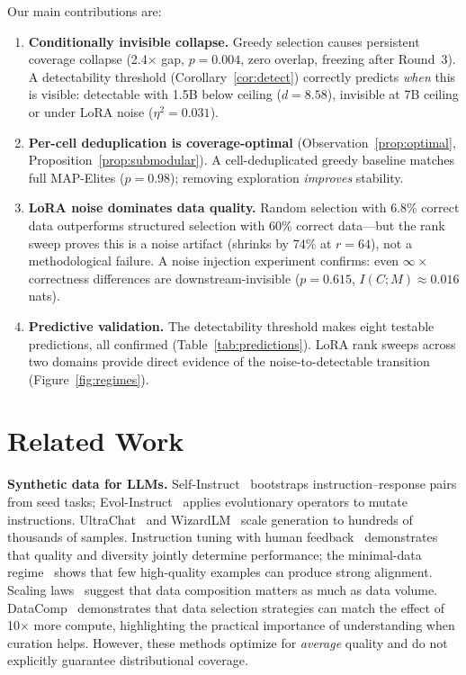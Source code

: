 \documentclass{article}
\theoremstyle{plain}
\theoremstyle{remark}
\begin{document}
Our main contributions are:
\begin{enumerate}[nosep]
  \item \textbf{Conditionally invisible collapse.} Greedy selection causes persistent coverage collapse (2.4$\times$ gap, $p{=}0.004$, zero overlap, freezing after Round~3). A detectability threshold (Corollary~\ref{cor:detect}) correctly predicts \emph{when} this is visible: detectable with 1.5B below ceiling ($d{=}8.58$), invisible at 7B ceiling or under LoRA noise ($\eta^2{=}0.031$).
  \item \textbf{Per-cell deduplication is coverage-optimal} (Observation~\ref{prop:optimal}, Proposition~\ref{prop:submodular}). A cell-deduplicated greedy baseline matches full MAP-Elites ($p{=}0.98$); removing exploration \emph{improves} stability.
  \item \textbf{LoRA noise dominates data quality.} Random selection with 6.8\% correct data outperforms structured selection with 60\% correct data---but the rank sweep proves this is a noise artifact (shrinks by 74\% at $r{=}64$), not a methodological failure. A noise injection experiment confirms: even $\infty\times$ correctness differences are downstream-invisible ($p{=}0.615$, $I(C;M){\approx}0.016$ nats).
  \item \textbf{Predictive validation.} The detectability threshold makes eight testable predictions, all confirmed (Table~\ref{tab:predictions}). LoRA rank sweeps across two domains provide direct evidence of the noise-to-detectable transition (Figure~\ref{fig:regimes}).
\end{enumerate}

\section{Related Work}
\label{sec:related}


\textbf{Synthetic data for LLMs.}
Self-Instruct~\citep{self_instruct_2023} bootstraps instruction--response pairs from seed tasks; Evol-Instruct~\citep{evol_instruct_2023} applies evolutionary operators to mutate instructions.
UltraChat~\citep{ultrachat_2023} and WizardLM~\citep{wizardlm_2023} scale generation to hundreds of thousands of samples.
Instruction tuning with human feedback~\citep{ouyang2022training} demonstrates that quality and diversity jointly determine performance; the minimal-data regime~\citep{zhou2023lima} shows that few high-quality examples can produce strong alignment.
Scaling laws~\citep{kaplan2020scaling} suggest that data composition matters as much as data volume.
DataComp~\citep{datacomp_2024} demonstrates that data selection strategies can match the effect of 10$\times$ more compute, highlighting the practical importance of understanding when curation helps.
However, these methods optimize for \emph{average} quality and do not explicitly guarantee distributional coverage.
\end{document}
